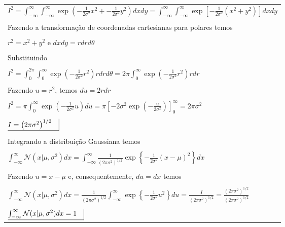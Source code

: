 \begin{enumerate}
\begin{tabular}{l}
\\
$I^2 = \int_{-\infty}^{\infty}\int_{-\infty}^{\infty}\exp\left(-\frac{1}{2\sigma^2}x^2 + -\frac{1}{2\sigma^2}y^2\right)dxdy = 
 \int_{-\infty}^{\infty}\int_{-\infty}^{\infty}\exp\left[-\frac{1}{2\sigma^2}(x^2+y^2) \right]dxdy $\\
\\
Fazendo a transformação de coordenadas cartesianas para polares temos\\
\\
$r^2 = x^2 + y^2$ e $dxdy = rdrd\theta$\\
\\
Substituindo\\
\\
$I^2 = \int_{0}^{2\pi}\int_{0}^{\infty}\exp\left(-\frac{1}{2\sigma^2}r^2 \right) r drd\theta =
2\pi\int_{0}^{\infty}\exp\left(-\frac{1}{2\sigma^2}r^2 \right) r dr$\\
\\
Fazendo $u = r^2$, temos $du = 2 r dr$\\
\\
$ I^2 = \pi\int_{0}^{\infty}\exp\left(-\frac{1}{2\sigma^2}u \right) du =
\pi \left[-2\sigma^2 \exp\left( -\frac{u}{2\sigma^2} \right)  \right]_0^\infty = 2\pi\sigma^2$\\
\\
$ \underline{I = \left( 2\pi\sigma^2 \right)^{1/2} \quad} \vline$\\
\\
Integrando a distribuição Gaussiana temos\\
\\
$\int_{-\infty}^{\infty}\mathcal{N}(x | \mu, \sigma^2)dx = \int_{-\infty}^{\infty} \frac{1}{(2\pi\sigma^2)^{1/2}}\exp\left\{ -\frac{1}{2\sigma^2}(x - \mu)^2 \right\} dx$\\
\\
Fazendo $u = x - \mu$ e, consequentemente, $du = dx$ temos\\
\\
$\int_{-\infty}^{\infty}\mathcal{N}(x | \mu, \sigma^2)dx =\frac{1}{(2\pi\sigma^2)^{1/2}} \int_{-\infty}^{\infty} \exp\left\{ -\frac{1}{2\sigma^2}u^2 \right\} du =\frac{I}{(2\pi\sigma^2)^{1/2}} = \frac{{(2\pi\sigma^2)^{1/2}}}{(2\pi\sigma^2)^{1/2}} $\\
\\
$\underline{\int_{-\infty}^{\infty}\mathcal{N}(x | \mu, \sigma^2)dx = 1 \quad} \vline $
\end{tabular}



\end{enumerate}
